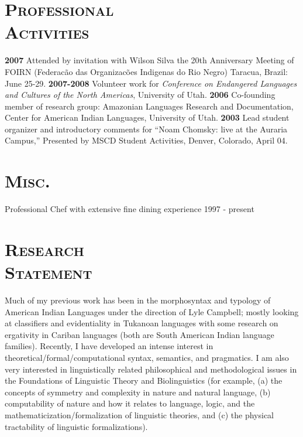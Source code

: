 \documentclass{resume}
\begin{document}
\begin{resume}
\section{\textsc{Professional\\ Activities}} 
{\bf 2007} Attended by invitation with Wilson Silva the 20th Anniversary Meeting of FOIRN (Federac\~ao das Organizac\~oes Indigenas do Rio Negro) Taracua, Brazil: June 25-29. {\bf 2007-2008} Volunteer work for \textsl{Conference on Endangered Languages and Cultures of the North Americas}, University of Utah. {\bf 2006} Co-founding member of research group: Amazonian Languages Research and Documentation, Center for American Indian Languages, University of Utah. {\bf 2003} Lead student organizer and introductory comments for ``Noam Chomsky: live at the Auraria Campus,'' Presented by MSCD Student Activities, Denver, Colorado, April 04.

\section{\textsc{Misc.}}
Professional Chef with extensive fine dining experience \hfill 1997 - present
 
\section{\textsc{Research\\ Statement}}
Much of my previous work has been in the morphosyntax and typology of American Indian Languages under the direction of Lyle Campbell; mostly looking at classifiers and evidentiality in Tukanoan languages with some research on ergativity in Cariban languages (both are South American Indian language families). Recently, I have developed an intense interest in theoretical/formal/computational syntax, semantics, and pragmatics. I am also very interested in linguistically related philosophical and methodological issues in the Foundations of Linguistic Theory and Biolinguistics (for example, (a) the concepts of symmetry and complexity in nature and natural language, (b) computability of nature and how it relates to language, logic, and the mathematicization/formalization of linguistic theories, and (c) the physical tractability of linguistic formalizations).


\end{resume}
\end{document}
